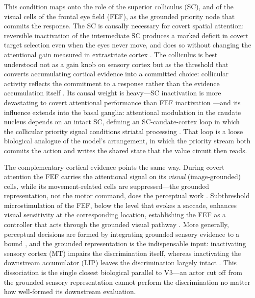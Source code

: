 This condition maps onto the role of the superior colliculus (SC), and of the visual cells of the frontal eye field (FEF), as the grounded priority node that commits the response. The SC is causally necessary for covert spatial attention: reversible inactivation of the intermediate SC produces a marked deficit in covert target selection even when the eyes never move, and does so without changing the attentional gain measured in extrastriate cortex \citep{zenon2012attention,lovejoy2010inactivation}. The colliculus is best understood not as a gain knob on sensory cortex but as the threshold that converts accumulating cortical evidence into a committed choice: collicular activity reflects the commitment to a response rather than the evidence accumulation itself \citep{stine2023differential}. Its causal weight is heavy---SC inactivation is more devastating to covert attentional performance than FEF inactivation \citep{bollimunta2018fefsc}---and its influence extends into the basal ganglia: attentional modulation in the caudate nucleus depends on an intact SC, defining an SC-caudate-cortex loop in which the collicular priority signal conditions striatal processing \citep{herman2020attention}. That loop is a loose biological analogue of the model's arrangement, in which the priority stream both commits the action and writes the shared state that the value circuit then reads.

The complementary cortical evidence points the same way. During covert attention the FEF carries the attentional signal on its \emph{visual} (image-grounded) cells, while its movement-related cells are suppressed---the grounded representation, not the motor command, does the perceptual work \citep{thompson2005neuronal}. Subthreshold microstimulation of the FEF, below the level that evokes a saccade, enhances visual sensitivity at the corresponding location, establishing the FEF as a controller that acts through the grounded visual pathway \citep{moore2001control,moore2004microstimulation}. More generally, perceptual decisions are formed by integrating grounded sensory evidence to a bound \citep{gold2007neural}, and the grounded representation is the indispensable input: inactivating sensory cortex (MT) impairs the discrimination itself, whereas inactivating the downstream accumulator (LIP) leaves the discrimination largely intact \citep{katz2016dissociated}. This dissociation is the single closest biological parallel to V3---an actor cut off from the grounded sensory representation cannot perform the discrimination no matter how well-formed its downstream evaluation.

